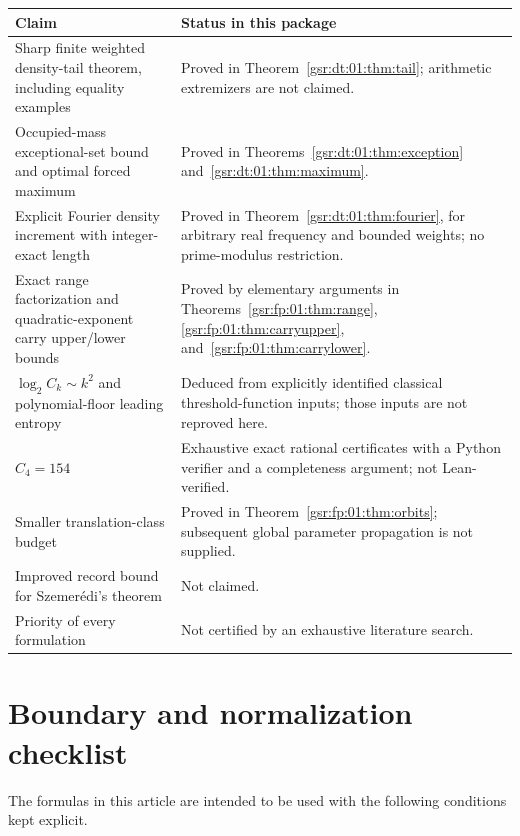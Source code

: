 \documentclass[11pt,letterpaper]{article}
\numberwithin{equation}{section}
\theoremstyle{definition}
\theoremstyle{remark}
\newcommand{\1}{\mathbf 1}
\newcommand{\srctag}[1]{\texorpdfstring{\enspace\textup{[#1]}}{ [#1]}}
\newcommand{\srcnote}[2]{\par\noindent{\small\textit{Source #1, delivered #2.}}\par}
\begin{document}
\begin{longtable}{@{}p{}p{}@{}}
\toprule
Claim & Status in this package\\
\midrule
\endhead
Sharp finite weighted density-tail theorem, including equality examples &
Proved in Theorem~\ref{gsr:dt:01:thm:tail}; arithmetic extremizers are not claimed.\\
\addlinespace
Occupied-mass exceptional-set bound and optimal forced maximum &
Proved in Theorems~\ref{gsr:dt:01:thm:exception} and~\ref{gsr:dt:01:thm:maximum}.\\
\addlinespace
Explicit Fourier density increment with integer-exact length &
Proved in Theorem~\ref{gsr:dt:01:thm:fourier}, for arbitrary real frequency and
bounded weights; no prime-modulus restriction.\\
\addlinespace
Exact range factorization and quadratic-exponent carry upper/lower bounds &
Proved by elementary arguments in Theorems~\ref{gsr:fp:01:thm:range},
\ref{gsr:fp:01:thm:carryupper}, and~\ref{gsr:fp:01:thm:carrylower}.\\
\addlinespace
$\log_2C_k\sim k^2$ and polynomial-floor leading entropy &
Deduced from explicitly identified classical threshold-function inputs;
those inputs are not reproved here.\\
\addlinespace
$C_4=154$ & Exhaustive exact rational certificates with a Python verifier
and a completeness argument; not Lean-verified.\\
\addlinespace
Smaller translation-class budget & Proved in Theorem~\ref{gsr:fp:01:thm:orbits};
subsequent global parameter propagation is not supplied.\\
\addlinespace
Improved record bound for Szemer\'edi's theorem & Not claimed.\\
\addlinespace
Priority of every formulation & Not certified by an exhaustive literature
search.\\
\bottomrule
\end{longtable}

\section[{Boundary and normalization checklist\srctag{01}}]{Boundary and normalization checklist}\label{gsr:fz:01:sec:dA}\label{gsr:fz:01:app:checklist}
\srcnote{01}{Appendix A}

The formulas in this article are intended to be used with the following
conditions kept explicit.
\end{document}
